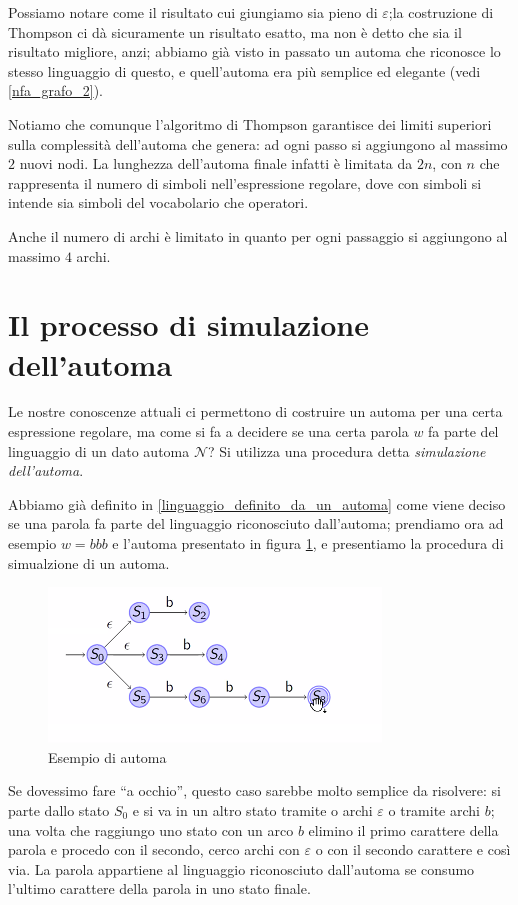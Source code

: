 \documentclass[class=book, crop=false, oneside, 12pt]{standalone}
\begin{document}
Possiamo notare come il risultato cui giungiamo sia pieno di \(\varepsilon\);la costruzione di Thompson ci dà sicuramente un risultato esatto, ma non è detto che sia il risultato migliore, anzi; abbiamo già visto in passato un automa che riconosce lo stesso linguaggio di questo, e quell'automa era più semplice ed elegante (vedi \ref{nfa_grafo_2}).

Notiamo che comunque l’algoritmo di Thompson garantisce dei limiti superiori sulla complessità dell’automa che genera: ad ogni passo si aggiungono al massimo \(2\) nuovi nodi.
La lunghezza dell’automa finale infatti è limitata da \(2n\), con \(n\) che rappresenta il numero di simboli nell’espressione regolare, dove con simboli si intende sia simboli del vocabolario che operatori.

Anche il numero di archi è limitato in quanto per ogni passaggio si aggiungono al massimo \(4\) archi.

\section{Il processo di simulazione dell’automa}
Le nostre conoscenze attuali ci permettono di costruire un automa per una certa espressione regolare, ma come si fa a decidere se una certa parola \(w\) fa parte del linguaggio di un dato automa \(\mathcal{N}\)? Si utilizza una procedura detta \emph{simulazione dell’automa}.

Abbiamo già definito in \ref{linguaggio_definito_da_un_automa} come viene deciso se una parola fa parte del linguaggio riconosciuto dall’automa; prendiamo ora ad esempio \(w = bbb\) e l’automa presentato in figura \ref{automa_secondo_esempio}, e presentiamo la procedura di simualzione di un automa.

\begin{figure}
    \centering
    \includegraphics[width=.6\textwidth,keepaspectratio]{automa_secondo_esempio}
    \caption{Esempio di automa}
    \label{automa_secondo_esempio}
\end{figure}

Se dovessimo fare “a occhio”, questo caso sarebbe molto semplice da risolvere: si parte dallo stato \(S_0\) e si va in un altro stato tramite o archi \(\varepsilon\) o tramite archi \(b\); una volta che raggiungo uno stato con un arco \(b\) elimino il primo carattere della parola e procedo con il secondo, cerco archi con \(\varepsilon\) o con il secondo carattere e così via.
La parola appartiene al linguaggio riconosciuto dall’automa se consumo l’ultimo carattere della parola in uno stato finale.
\end{document}
